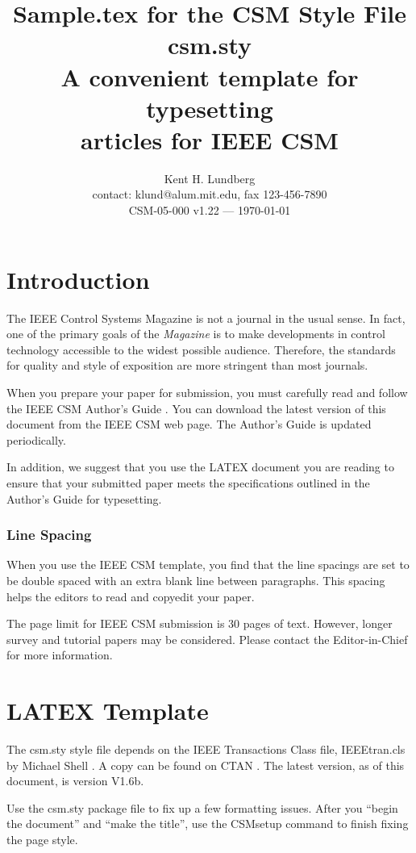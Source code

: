 \documentclass[letterpaper,12pt,peerreviewca,draftcls]{IEEEtran}
\title{Sample.tex for the CSM Style File csm.sty\\
A convenient template for typesetting\\
articles for IEEE CSM }
\author{Kent H. Lundberg \\
contact: klund@alum.mit.edu, fax 123-456-7890 \\
CSM-05-000 v1.22 --- \today}
\begin{document}
\maketitle
\CSMsetup


\section{Introduction}

The IEEE Control Systems Magazine is not a journal in the usual sense.
In fact, one of the primary goals of the {\it Magazine} is to make
developments in control technology accessible to the widest possible
audience.  Therefore, the standards for quality and style of exposition
are more stringent than most journals.


When you prepare your paper for submission, you must carefully read and
follow the IEEE CSM Author's Guide \cite{CSMguide}.  You can download
the latest version of this document from the IEEE CSM web page.  The
Author's Guide is updated periodically.


In addition, we suggest that you use the LATEX document you are reading
to ensure that your submitted paper meets the specifications outlined in
the Author's Guide for typesetting.


\subsubsection{Line Spacing}


When you use the IEEE CSM template, you find that the line spacings are
set to be double spaced with an extra blank line between paragraphs.
This spacing helps the editors to read and copyedit your paper.


The page limit for IEEE CSM submission is 30 pages of text.  However,
longer survey and tutorial papers may be considered.  Please contact the
Editor-in-Chief for more information.


\section{LATEX Template}


The csm.sty style file depends on the IEEE Transactions Class file,
IEEEtran.cls by Michael Shell \cite{IEEEtran}.  A copy can be found on
CTAN \cite{ctan}.  The latest version, as of this document, is version
V1.6b.

Use the csm.sty \cite{csm.sty} package file to fix up a few formatting
issues.  After you ``begin the document'' and ``make the title'', use
the CSMsetup command to finish fixing the page style.
\end{document}
